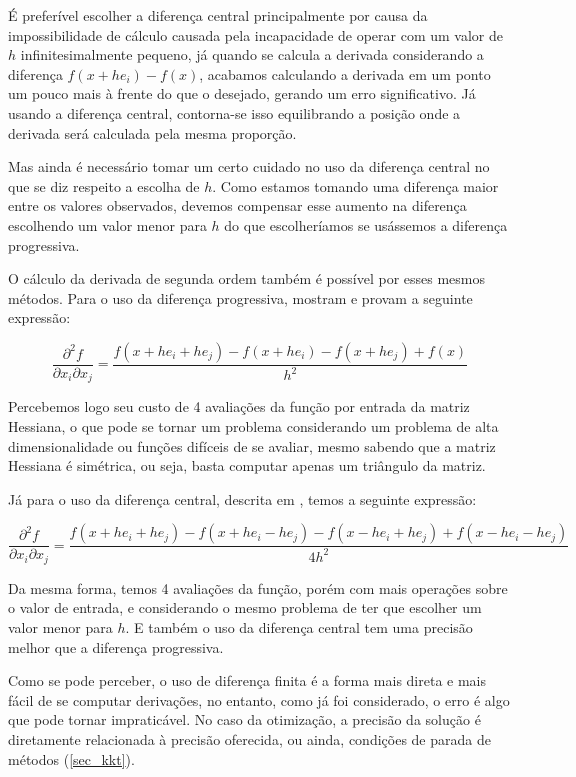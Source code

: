 É preferível escolher a diferença central principalmente por causa da impossibilidade de
cálculo causada pela incapacidade de operar com um valor de \(h\) infinitesimalmente pequeno, já
quando se calcula a derivada considerando a diferença \(f(x+he_i) - f(x)\), acabamos
calculando a derivada em um ponto um pouco mais à frente do que o desejado, gerando um erro
significativo. Já usando a diferença central, contorna-se isso equilibrando a posição onde a
derivada será calculada pela mesma proporção.

Mas ainda é necessário tomar um certo cuidado no uso da diferença central no que se diz
respeito a escolha de \(h\). Como estamos tomando uma diferença maior entre os valores
observados, devemos compensar esse aumento na diferença escolhendo um valor menor para \(h\)
do que escolheríamos se usássemos a diferença progressiva.

O cálculo da derivada de segunda ordem também é possível por esses mesmos métodos.
Para o uso da diferença progressiva, \cite{dennisschnabel1996} mostram e provam a seguinte
expressão:

\begin{equation}
\frac{\partial^2 f}{\partial x_i \partial x_j} = \frac{f(x+he_i + he_j) - f(x+he_i) - f(x+he_j) + f(x)}{h^2}
\end{equation}

Percebemos logo seu custo de 4 avaliações da função por entrada da matriz Hessiana, o que pode
se tornar um problema considerando um problema de alta dimensionalidade ou funções difíceis de
se avaliar, mesmo sabendo que a matriz Hessiana é simétrica, ou seja, basta computar apenas um
triângulo da matriz.

Já para o uso da diferença central, descrita em \cite{abramowitz1972handbook}, temos a seguinte
expressão:

{\footnotesize
  \begin{equation}
    \label{diffinitah}
      \frac{\partial^2 f}{\partial x_i \partial x_j} = \frac{f(x + he_i + he_j) - f(x + he_i - he_j) - f(x -he_i + he_j) + f(x - he_i -he_j )}{4h^2}
    \end{equation}
}


Da mesma forma, temos 4 avaliações da função, porém com mais operações sobre o valor de entrada,
e considerando o mesmo problema de ter que escolher um valor menor para \(h\). E também o uso da
diferença central tem uma precisão melhor que a diferença progressiva.

Como se pode perceber, o uso de diferença finita é a forma mais direta e mais fácil de se
computar derivações, no entanto, como já foi considerado, o erro é algo que pode tornar
impraticável. No caso da otimização, a precisão da solução é diretamente relacionada à
precisão oferecida, ou ainda, condições de parada de métodos (\ref{sec_kkt}).

